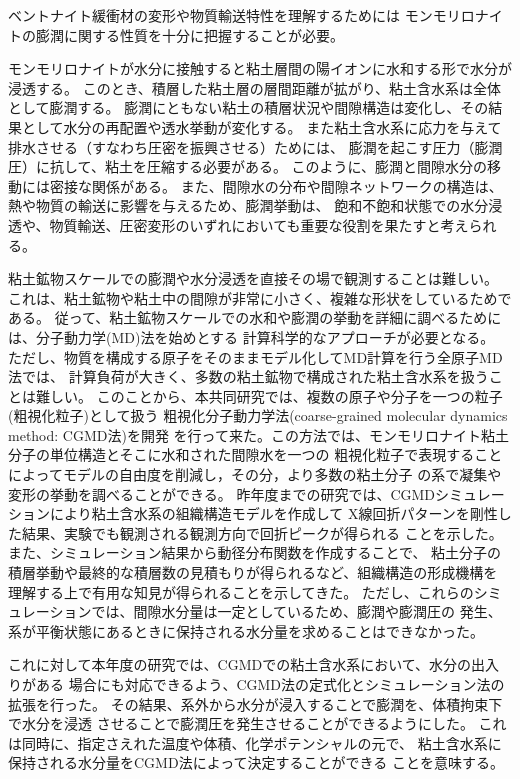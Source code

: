 ベントナイト緩衝材の変形や物質輸送特性を理解するためには
モンモリロナイトの膨潤に関する性質を十分に把握することが必要。

モンモリロナイトが水分に接触すると粘土層間の陽イオンに水和する形で水分が浸透する。
このとき、積層した粘土層の層間距離が拡がり、粘土含水系は全体として膨潤する。
膨潤にともない粘土の積層状況や間隙構造は変化し、その結果として水分の再配置や透水挙動が変化する。
また粘土含水系に応力を与えて排水させる（すなわち圧密を振興させる）ためには、
膨潤を起こす圧力（膨潤圧）に抗して、粘土を圧縮する必要がある。
このように、膨潤と間隙水分の移動には密接な関係がある。
また、間隙水の分布や間隙ネットワークの構造は、熱や物質の輸送に影響を与えるため、膨潤挙動は、
飽和不飽和状態での水分浸透や、物質輸送、圧密変形のいずれにおいても重要な役割を果たすと考えられる。

粘土鉱物スケールでの膨潤や水分浸透を直接その場で観測することは難しい。
これは、粘土鉱物や粘土中の間隙が非常に小さく、複雑な形状をしているためである。
従って、粘土鉱物スケールでの水和や膨潤の挙動を詳細に調べるためには、分子動力学(MD)法を始めとする
計算科学的なアプローチが必要となる。
ただし、物質を構成する原子をそのままモデル化してMD計算を行う全原子MD法では、
計算負荷が大きく、多数の粘土鉱物で構成された粘土含水系を扱うことは難しい。
このことから、本共同研究では、複数の原子や分子を一つの粒子(粗視化粒子)として扱う
粗視化分子動力学法(coarse-grained molecular dynamics method: CGMD法)を開発
を行って来た。この方法では、モンモリロナイト粘土分子の単位構造とそこに水和された間隙水を一つの
粗視化粒子で表現することによってモデルの自由度を削減し，その分，より多数の粘土分子
の系で凝集や変形の挙動を調べることができる。
昨年度までの研究では、CGMDシミュレーションにより粘土含水系の組織構造モデルを作成して
X線回折パターンを剛性した結果、実験でも観測される観測方向で回折ピークが得られる
ことを示した。また、シミュレーション結果から動径分布関数を作成することで、
粘土分子の積層挙動や最終的な積層数の見積もりが得られるなど、組織構造の形成機構を
理解する上で有用な知見が得られることを示してきた。
ただし、これらのシミュレーションでは、間隙水分量は一定としているため、膨潤や膨潤圧の
発生、系が平衡状態にあるときに保持される水分量を求めることはできなかった。
　

これに対して本年度の研究では、CGMDでの粘土含水系において、水分の出入りがある
場合にも対応できるよう、CGMD法の定式化とシミュレーション法の拡張を行った。
その結果、系外から水分が浸入することで膨潤を、体積拘束下で水分を浸透
させることで膨潤圧を発生させることができるようにした。
これは同時に、指定さえれた温度や体積、化学ポテンシャルの元で、
粘土含水系に保持される水分量をCGMD法によって決定することができる
ことを意味する。

